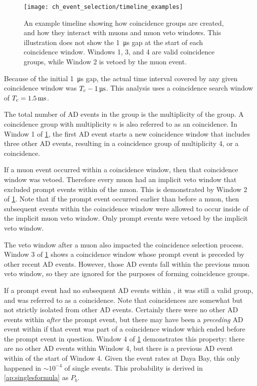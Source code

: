 \begin{figure}
    \centering
    \texttt{[image: ch\_event\_selection/timeline\_examples]}
    \caption[Coincidence groups diagram]{
        An example timeline showing how coincidence groups are created,
        and how they interact with muons and muon veto windows.
        This illustration does not show the \SI{1}{\micro\second} gap
        at the start of each coincidence window.
        Windows 1, 3, and 4 are valid coincidence groups,
        while Window 2 is vetoed by the muon event.
    }
    \label{fig:timeline_examples}
\end{figure}

Because of the initial \SI{1}{\micro\second} gap,
the actual time interval covered by any given coincidence window was
$T_c - \SI{1}{\micro\second}$.
This analysis uses a coincidence search window of $T_c = \SI{1.5}{\milli\second}$.

The total number of AD events in the group
is the multiplicity of the group.
A coincidence group with multiplicity $n$ is also referred to
as an  coincidence.
In Window 1 of \cref{fig:timeline_examples},
the first AD event starts a new coincidence window
that includes three other AD events,
resulting in a coincidence group of multiplicity 4, or a  coincidence.

If a muon event occurred within a coincidence window,
then that coincidence window was vetoed.
Therefore every muon had an implicit veto window
that excluded prompt events within \tc{} of the muon.
This is demonstrated by Window 2 of \cref{fig:timeline_examples}.
Note that if the prompt event occurred earlier than \tc{} before a muon,
then subsequent events within the coincidence window
were allowed to occur inside of the implicit muon veto window.
Only prompt events were vetoed by the implicit veto window.

The veto window after a muon also impacted the coincidence selection process.
Window 3 of \cref{fig:timeline_examples} shows a coincidence window
whose prompt event is preceded by other recent AD events.
However, those AD events fall within the previous muon veto window,
so they are ignored for the purposes of forming coincidence groups.

If a prompt event had no subsequent AD events within \tc, it was
still a valid group, and was referred to as a  coincidence.
Note that  coincidences are somewhat but not strictly isolated
from other AD events.
Certainly there were no other AD events
within \tc{} \textit{after} the prompt event,
but there may have been a \textit{preceding} AD event within \tc{}
if that event was part of a coincidence window
which ended before the prompt event in question.
Window 4 of \cref{fig:timeline_examples} demonstrates this property:
there are no other AD events within Window 4,
but there is a previous AD event within \tc{} of the start of Window 4.
Given the event rates at Daya Bay, this only happened in ${\sim}10^{-4}$
of single events.
This probability is derived in \cref{ap:singlesformula} as $P_b$.


